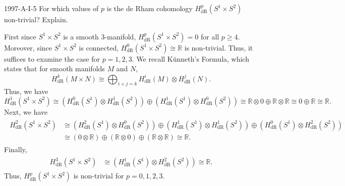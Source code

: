 \documentclass{article}
\begin{document}
	\begin{prb}{1997-A-I-5}
		For which values of $p$ is the de Rham cohomology $H^{p}_{\text{dR}}(S^{1} \times S^{2})$ non-trivial? Explain. 
	\end{prb}
	First since $S^{1} \times S^{2}$ is a smooth 3-manifold, $H^{p}_{\text{dR}}(S^{1} \times S^{2}) = 0$ for all $p \geq 4$. Moreover, since $S^{1} \times S^{2}$ is connected, $H^{0}_{\text{dR}}(S^{1} \times S^{2}) \cong \mathbb{R}$ is non-trivial. Thus, it suffices to examine the case for $p = 1, 2, 3$. We recall K\"unneth's Formula, which states that for smooth manifolds $M$ and $N$, 
	\begin{equation*}
		H^{k}_{\text{dR}}(M \times N) \cong \bigoplus_{i + j = k}H^{i}_{\text{dR}}(M) \otimes H^{j}_{\text{dR}}(N). 
	\end{equation*}
	Thus, we have 
	\begin{equation*}
		H^{1}_{\text{dR}}(S^{1} \times S^{2}) \cong \left(H^{0}_{\text{dR}}(S^{1}) \otimes H^{1}_{\text{dR}}(S^{2})\right) \oplus \left(H^{1}_{\text{dR}}(S^{1}) \otimes H^{0}_{\text{dR}}(S^{2})\right) \cong \mathbb{R} \otimes 0 \oplus \mathbb{R} \otimes \mathbb{R} \cong 0 \oplus \mathbb{R} \cong \mathbb{R}. 
	\end{equation*}
	Next, we have 
	\begin{align*}
		\begin{split}
			H^{2}_{\text{dR}}(S^{1} \times S^{2}) &\cong (H^{2}_{\text{dR}}(S^{1}) \otimes H^{0}_{\text{dR}}(S^{2})) \oplus (H^{1}_{\text{dR}}(S^{1}) \otimes H^{1}_{\text{dR}}(S^{2})) \oplus (H^{0}_{\text{dR}}(S^{1}) \otimes H^{2}_{\text{dR}}(S^{2})) \\
			&\cong (0 \otimes \mathbb{R}) \oplus (\mathbb{R} \otimes 0) \oplus (\mathbb{R} \otimes \mathbb{R}) \cong \mathbb{R}. 
		\end{split}
	\end{align*}
	Finally, 
	\begin{align*}
		\begin{split}
			H^{3}_{\text{dR}}(S^{1} \times S^{2}) &\cong (H^{1}_{\text{dR}}(S^{1}) \otimes H^{2}_{\text{dR}}(S^{2})) \cong \mathbb{R}. 
		\end{split}
	\end{align*}
	Thus, $H^{p}_{\text{dR}}(S^{1} \times S^{2})$ is non-trivial for $p = 0, 1, 2, 3$. 
	
\end{document}
